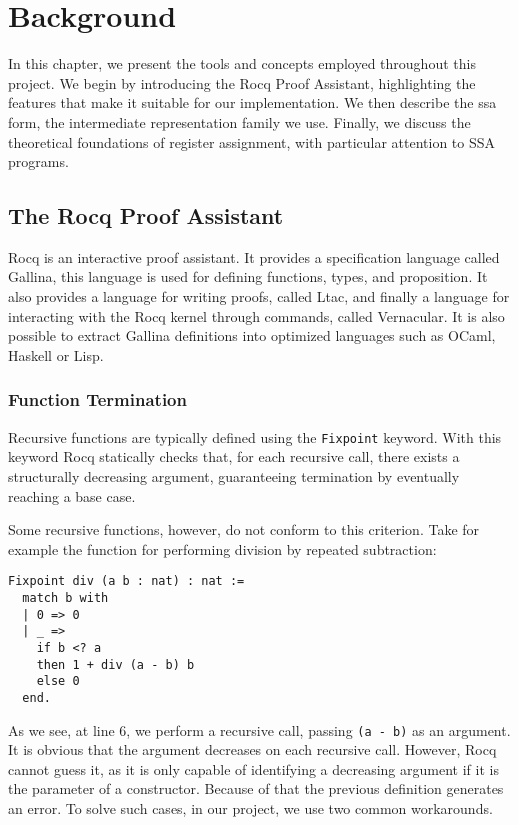
\chapter{Background}
\label{cha:background}

In this chapter, we present the tools and concepts employed throughout this project. We begin by introducing the Rocq Proof Assistant, highlighting the features that make it suitable for our implementation. We then describe the \gls{ssa} form, the intermediate representation family we use. Finally, we discuss the theoretical foundations of register assignment, with particular attention to SSA programs.

\section{The Rocq Proof Assistant}

Rocq is an interactive proof assistant. It provides a specification language called Gallina, this language is used for defining functions, types, and proposition. It also provides a language for writing proofs, called Ltac, and finally a language for interacting with the Rocq kernel through commands, called Vernacular. It is also possible to extract Gallina definitions into optimized languages such as OCaml, Haskell or Lisp.

\subsection{Function Termination}
\label{subsec:funterm}

Recursive functions are typically defined using the \texttt{Fixpoint} keyword. With this keyword Rocq statically checks that, for each recursive call, there exists a structurally decreasing argument, guaranteeing termination by eventually reaching a base case.

Some recursive functions, however, do not conform to this criterion. Take for example the function for performing division by repeated subtraction:

\begin{lstlisting}[style=Rocq]
Fixpoint div (a b : nat) : nat :=
  match b with
  | 0 => 0
  | _ =>
    if b <? a
    then 1 + div (a - b) b
    else 0
  end.
\end{lstlisting}

As we see, at line 6, we perform a recursive call, passing \texttt{(a - b)} as an argument. It is obvious that the argument decreases on each recursive call. However, Rocq cannot guess it, as it is only capable of identifying a decreasing argument if it is the parameter of a constructor. Because of that the previous definition generates an error.
To solve such cases, in our project, we use two common workarounds.

